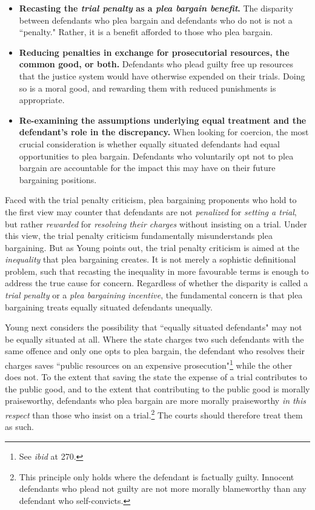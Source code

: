 \begin{itemize}
    \item \textbf{Recasting the \textit{trial penalty} as a \textit{plea bargain benefit}.} The disparity between defendants who plea bargain and defendants who do not is not a ``penalty." Rather, it is a benefit afforded to those who plea bargain.
    \item \textbf{Reducing penalties in exchange for prosecutorial resources, the common good, or both.} Defendants who plead guilty free up resources that the justice system would have otherwise expended on their trials. Doing so is a moral good, and rewarding them with reduced punishments is appropriate.
    \item \textbf{Re-examining the assumptions underlying equal treatment and the defendant's role in the discrepancy.} When looking for coercion, the most crucial consideration is whether equally situated defendants had equal opportunities to plea bargain. Defendants who voluntarily opt not to plea bargain are accountable for the impact this may have on their future bargaining positions.
\end{itemize}
Faced with the trial penalty criticism, plea bargaining proponents who hold to the first view may counter that defendants are not \textit{penalized} for \textit{setting a trial}, but rather \textit{rewarded} for \textit{resolving their charges} without insisting on a trial. Under this view, the trial penalty criticism fundamentally misunderstands plea bargaining. But as Young points out, the trial penalty criticism is aimed at the \textit{inequality} that plea bargaining creates. It is not merely a sophistic definitional problem, such that recasting the inequality in more favourable terms is enough to address the true cause for concern. Regardless of whether the disparity is called a \textit{trial penalty} or a \textit{plea bargaining incentive}, the fundamental concern is that plea bargaining treats equally situated defendants unequally.

Young next considers the possibility that ``equally situated defendants" may not be equally situated at all. Where the state charges two such defendants with the same offence and only one opts to plea bargain, the defendant who resolves their charges saves ``public resources on an expensive prosecution"\footnote{See \textit{ibid} at 270.} while the other does not. To the extent that saving the state the expense of a trial contributes to the public good, and to the extent that contributing to the public good is morally praiseworthy, defendants who plea bargain are more morally praiseworthy \textit{in this respect} than those who insist on a trial.\footnote{This principle only holds where the defendant is factually guilty. Innocent defendants who plead not guilty are not more morally blameworthy than any defendant who self-convicts.} The courts should therefore treat them as such.

